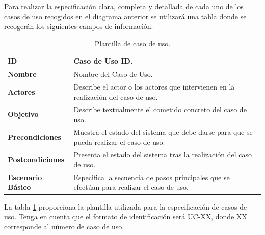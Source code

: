 Para realizar la especificación clara, completa y detallada de cada uno de los casos de uso recogidos en el diagrama anterior se utilizará una tabla donde se recogerán los siguientes campos de información.

\begin{center}
\begin{table}[htbp]
\centering
\begin{tabular}{@{}p{2.5cm} p{9cm}@{}} 
\toprule
\textbf{ID}	& Caso de Uso ID.  \\
\midrule
\textbf{Nombre} 		& Nombre del Caso de Uso.   \\
\midrule
\textbf{Actores} 		&	Describe el actor o los actores que intervienen en la realización del caso de uso.  \\
\midrule
\textbf{Objetivo} 	&	Describe textualmente el cometido concreto del caso de uso. 	 \\
\midrule
\textbf{Precondiciones}	&	Muestra el estado del sistema que debe darse para que se pueda realizar el caso de uso.   \\
\midrule
\textbf{Postcondiciones} 	&	Presenta el estado del sistema tras la realización del caso de uso.   \\
\midrule
\textbf{Escenario Básico} 	&  Especifica la secuencia de pasos principales que se efectúan para realizar el caso de uso. \\
\bottomrule
\end{tabular}
\caption{Plantilla de caso de uso.}
\label{tab:uc_template}
\end{table}
\end{center}

La tabla \ref{tab:uc_template} proporciona la plantilla utilizada para la especificación de casos de uso. Tenga en cuenta que el formato de identificación será UC-XX, donde XX corresponde al número de caso de uso. 

